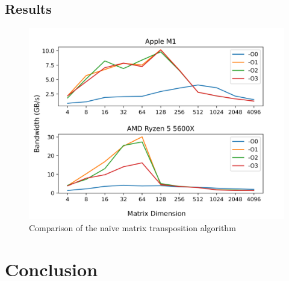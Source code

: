 \documentclass{article}
\begin{document}
\subsection{Results}
\begin{figure}[H]
    \centering
    \includegraphics[scale=0.8]{report/img/naive_comparison.png}
    \caption{Comparison of the na\"{i}ve matrix transposition algorithm}
\end{figure}
\section{Conclusion}
\end{document}
